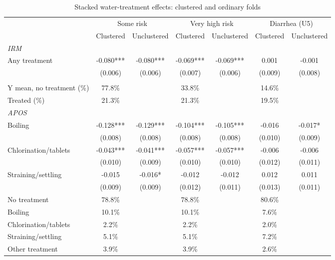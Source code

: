 \begin{table}[htbp]
\centering
\caption{Stacked water-treatment effects: clustered and ordinary folds}
\label{tab:water-treatment-appendix}
\scriptsize
\setlength{\tabcolsep}{4pt}
\renewcommand{\arraystretch}{0.92}
\begin{adjustbox}{max width=\linewidth}
\begin{tabular}{lcccccc}
\hline\hline
 & \multicolumn{2}{c}{Some risk} & \multicolumn{2}{c}{Very high risk} & \multicolumn{2}{c}{Diarrhea (U5)} \\
 & Clustered & Unclustered & Clustered & Unclustered & Clustered & Unclustered \\
\hline
\multicolumn{7}{l}{\textit{IRM}} \\
Any treatment & -0.080*** & -0.080*** & -0.069*** & -0.069*** & 0.001 & -0.001 \\
 & (0.006) & (0.006) & (0.007) & (0.006) & (0.009) & (0.008) \\
\addlinespace[6pt]
\multicolumn{7}{l}{\textit{Descriptive statistics}} \\
Y mean, no treatment (\%) & 77.8\% &  & 33.8\% &  & 14.6\% &  \\
Treated (\%) & 21.3\% &  & 21.3\% &  & 19.5\% &  \\
\midrule
\multicolumn{7}{l}{\textit{APOS}} \\
Boiling & -0.128*** & -0.129*** & -0.104*** & -0.105*** & -0.016 & -0.017* \\
 & (0.008) & (0.008) & (0.008) & (0.008) & (0.010) & (0.009) \\
Chlorination/tablets & -0.043*** & -0.041*** & -0.057*** & -0.057*** & -0.006 & -0.006 \\
 & (0.010) & (0.009) & (0.010) & (0.010) & (0.012) & (0.011) \\
Straining/settling & -0.015 & -0.016* & -0.012 & -0.012 & 0.012 & 0.011 \\
 & (0.009) & (0.009) & (0.012) & (0.011) & (0.013) & (0.011) \\
\addlinespace[6pt]
No treatment & 78.8\% &  & 78.8\% &  & 80.6\% &  \\
Boiling & 10.1\% &  & 10.1\% &  & 7.6\% &  \\
Chlorination/tablets & 2.2\% &  & 2.2\% &  & 2.0\% &  \\
Straining/settling & 5.1\% &  & 5.1\% &  & 7.2\% &  \\
Other treatment & 3.9\% &  & 3.9\% &  & 2.6\% &  \\

\end{tabular}
\end{adjustbox}
\end{table}
